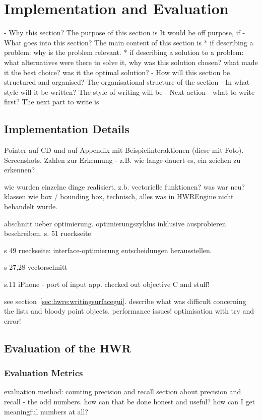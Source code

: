 
\chapter{Implementation and Evaluation}

- Why this section? 
  The purpose of this section is 
  It would be off purpose, if 
- What goes into this section?
  The main content of this section is 
  * if describing a problem: why is the problem relevant.
  * if describing a solution to a problem: what alternatives were
    there to solve it, why was this solution chosen? 
    what made it the best choice? was it the optimal solution?
- How will this section be structured and organised?
  The organisational structure of the section 
- In what style will it be written?
  The style of writing will be 
- Next action - what to write first?
  The next part to write is

\section{Implementation Details}
Pointer auf CD und auf Appendix mit Beispielinteraktionen (diese mit Foto).
Screenshots.
Zahlen zur Erkennung - z.B. wie lange dauert es, ein zeichen zu erkennen?

wie wurden einzelne dinge realisiert, z.b. vectorielle funktionen?
was war neu?
klassen wie box / bounding box, technisch, alles was in HWREngine nicht behandelt
wurde.

abschnitt ueber optimierung.
optimierungszyklus inklusive ausprobieren beschreiben.
s. 51 rueckseite

s 49 rueckseite: interface-optimierung
entscheidungen herausstellen. 

s 27,28 vectorschnitt

s.11 iPhone - port of input app. checked out objective C and stuff!

see section~\ref{sec:hwre:writingsurfacegui}. describe what was difficult concerning the lists and bloody point objects.
performance issues! optimisation with try and error!


\section{Evaluation of the HWR}
\subsection{ Evaluation Metrics }
evaluation method: counting precision and recall
section about precision and recall - the odd numbers.
how can that be done honest and useful?
how can I get meaningful numbers at all?

